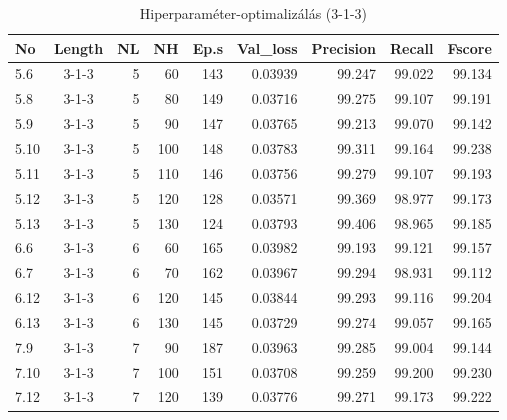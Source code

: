 \documentclass[a4paper, magyar]{article}
\begin{document}
\begin{small}
	\begin{table}[tp]\centering
		\begin{tabular}{|l|c|r|r|r|r|r|r|r|}
			\hline
			No&Length&NL&NH&Ep.s&Val\_loss&Precision&Recall&Fscore\\
			\hline\hline
			5.6&3-1-3&5&60&143&0.03939&99.247&99.022&99.134\\
			\hline
			5.8&3-1-3&5&80&149&0.03716&99.275&99.107&99.191\\
			\hline
			5.9&3-1-3&5&90&147&0.03765&99.213&99.070&99.142\\
			\hline
			5.10&3-1-3&5&100&148&0.03783&99.311&99.164&99.238\\
			\hline
			5.11&3-1-3&5&110&146&0.03756&99.279&99.107&99.193\\
			\hline
			5.12&3-1-3&5&120&128&0.03571&99.369&98.977&99.173\\
			\hline
			5.13&3-1-3&5&130&124&0.03793&99.406&98.965&99.185\\
			\hline
			6.6&3-1-3&6&60&165&0.03982&99.193&99.121&99.157\\
			\hline
			6.7&3-1-3&6&70&162&0.03967&99.294&98.931&99.112\\
			\hline
			6.12&3-1-3&6&120&145&0.03844&99.293&99.116&99.204\\
			\hline
			6.13&3-1-3&6&130&145&0.03729&99.274&99.057&99.165\\
			\hline
			7.9&3-1-3&7&90&187&0.03963&99.285&99.004&99.144\\
			\hline
			7.10&3-1-3&7&100&151&0.03708&99.259&99.200&99.230\\
			\hline
			7.12&3-1-3&7&120&139&0.03776&99.271&99.173&99.222\\
			\hline
		\end{tabular}
		\caption{Hiperparaméter-optimalizálás (3-1-3)}
		\label{tab:optprf}
	\end{table}
\end{small}
\newpage


\end{document}
